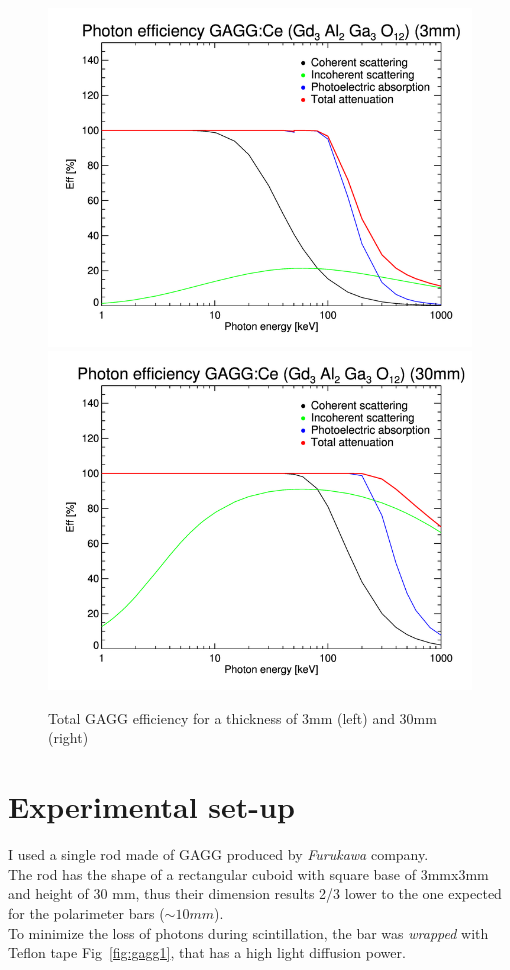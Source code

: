 \documentclass[10pt,a4paper, openany]{book}
\begin{document}
\begin{figure}[!h]
\begin{center}
\includegraphics[scale=0.24]{imm/eff_gagg_3mm.png}
\includegraphics[scale=0.24]{imm/eff_gagg_30mm.png}
\end{center}
\caption{Total GAGG efficiency for a thickness of 3mm (left) and 30mm (right)}
\label{fig:eff_gagg}
\end{figure}

\newpage

\section{Experimental set-up}
I used a single rod made of GAGG produced by \emph{Furukawa} company.\\
The rod has the shape of a rectangular cuboid with square base of 3mmx3mm and height of 30 mm, thus their dimension results 2/3 lower  to the one expected for the polarimeter bars ($\sim 10mm$).\\
To minimize the loss of photons during scintillation, the bar was \emph{wrapped} with Teflon tape Fig~\ref{fig:gagg1}, that has a high light diffusion power.
\end{document}
